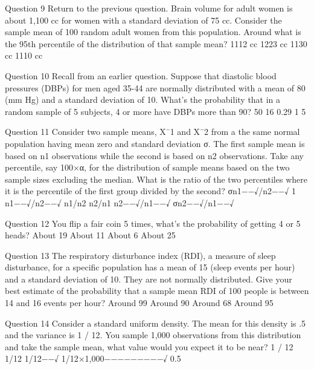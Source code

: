 
Question 9
Return to the previous question. Brain volume for adult women is about 1,100 cc for women with a standard deviation of 75 cc. Consider the sample mean of 100 random adult women from this population. Around what is the 95th percentile of the distribution of that sample mean?
1112 cc
1223 cc
1130 cc
1110 cc

Question 10
Recall from an earlier question. Suppose that diastolic blood pressures (DBPs) for men aged 35-44 are normally distributed with a mean of 80 (mm Hg) and a standard deviation of 10. What's the probability that in a random sample of 5 subjects, 4 or more have DBPs more than 90?
50%
16%
0.29 %
1%
5%


Question 11
Consider two sample means, X¯1 and X¯2 from a the same normal population having mean zero and standard deviation σ. The first sample mean is based on n1 observations while the second is based on n2 observations. Take any percentile, say 100×α, for the distribution of sample means based on the two sample sizes excluding the median. What is the ratio of the two percentiles where it is the percentile of the first group divided by the second?
σn1−−√/n2−−√
1
n1−−√/n2−−√
n1/n2
n2/n1
n2−−√/n1−−√
σn2−−√/n1−−√

Question 12
You flip a fair coin 5 times, what's the probability of getting 4 or 5 heads?
About 19%
About 11%
About 6%
About 25%


Question 13
The respiratory disturbance index (RDI), a measure of sleep disturbance, for a specific population has a mean of 15 (sleep events per hour) and a standard deviation of 10. They are not normally distributed. Give your best estimate of the probability that a sample mean RDI of 100 people is between 14 and 16 events per hour?
Around 99%
Around 90%
Around 68%
Around 95%


Question 14
Consider a standard uniform density. The mean for this density is .5 and the variance is 1 / 12. You sample 1,000 observations from this distribution and take the sample mean, what value would you expect it to be near?
1 / 12
1/12
1/12−−√
1/12×1,000−−−−−−−−−√
0.5

